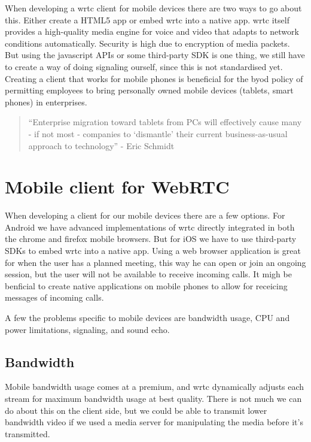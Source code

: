 When developing a \gls{wrtc} client for mobile devices there are two ways to go about this. Either create a HTML5 app or embed \gls{wrtc} into a native app. \gls{wrtc} itself provides a high-quality media engine for voice and video that adapts to network conditions automatically. Security is high due to encryption of media packets. But using the javascript APIs or some third-party SDK is one thing, we still have to create a way of doing signaling ourself, since this is not standardised yet. Creating a client that works for mobile phones is beneficial for the \gls{byod} policy of permitting employees to bring personally owned mobile devices (tablets, smart phones) in enterprises.

\begin{quote}
``Enterprise migration toward tablets from PCs will effectively cause many - if not most - companies to `dismantle' their current business-as-usual approach to technology'' - Eric Schmidt
\end{quote}


\section{Mobile client for WebRTC}
When developing a client for our mobile devices there are a few options. For Android we have advanced implementations of \gls{wrtc} directly integrated in both the chrome and firefox mobile browsers. But for iOS we have to use third-party SDKs to embed \gls{wrtc} into a native app.
Using a web browser application is great for when the user has a planned meeting, this way he can open or join an ongoing session, but the user will not be available to receive incoming calls. It migh be benficial to create native applications on mobile phones to allow for receicing messages of incoming calls.

A few the problems specific to mobile devices are bandwidth usage, CPU and power limitations, signaling, and sound echo.

\subsection{Bandwidth}
Mobile bandwidth usage comes at a premium, and \gls{wrtc} dynamically adjusts each stream for maximum bandwidth usage at best quality. There is not much we can do about this on the client side, but we could be able to transmit lower bandwidth video if we used a media server for manipulating the media before it's transmitted. 


